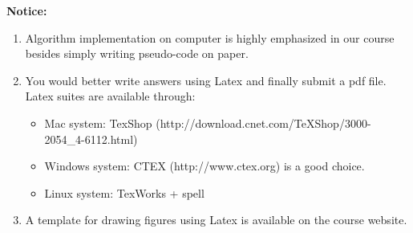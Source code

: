 \documentclass[12pt]{article}
\begin{document}
{\bf Notice:}
\begin{enumerate}  
\item Algorithm implementation on computer is highly emphasized in our course besides simply writing pseudo-code on paper. 
\item You would better write answers using Latex and finally submit a pdf file. Latex suites are available through: 
\begin{itemize}
\item Mac system: TexShop (http://download.cnet.com/TeXShop/3000-2054\_4-6112.html)
\item Windows system: CTEX (http://www.ctex.org) is a good choice. 
\item Linux system: TexWorks + spell 
\end{itemize} 
\item A template for drawing figures using Latex is available on the course website. 
\end{enumerate} 

\end{document}
